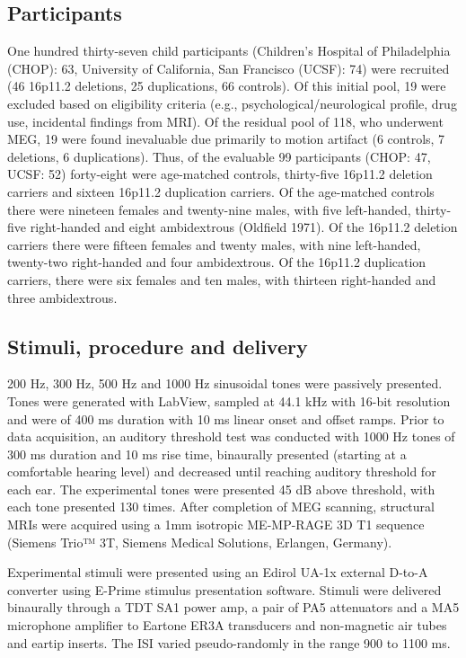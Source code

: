 \documentclass{article}
\begin{document}
\subsection*{Participants}
One hundred thirty-seven child participants (Children’s Hospital of Philadelphia (CHOP): 63, University of California, San Francisco (UCSF): 74) were recruited (46 16p11.2 deletions, 25 duplications, 66 controls). Of this initial pool, 19 were excluded based on eligibility criteria (e.g., psychological/neurological profile, drug use, incidental findings from MRI). Of the residual pool of 118, who underwent MEG, 19 were found inevaluable due primarily to motion artifact (6 controls, 7 deletions, 6 duplications). Thus, of the evaluable 99 participants (CHOP: 47, UCSF: 52) forty-eight were age-matched controls, thirty-five 16p11.2 deletion carriers and sixteen 16p11.2 duplication carriers. Of the age-matched controls there were nineteen females and twenty-nine males, with five left-handed, thirty-five right-handed and eight ambidextrous (Oldfield 1971).  Of the 16p11.2 deletion carriers there were fifteen females and twenty males, with nine left-handed, twenty-two right-handed and four ambidextrous.  Of the 16p11.2 duplication carriers, there were six females and ten males, with thirteen right-handed and three ambidextrous.  
\medskip

\subsection*{Stimuli, procedure and delivery}
200 Hz, 300 Hz, 500 Hz and 1000 Hz sinusoidal tones were passively presented. Tones were generated with LabView, sampled at 44.1 kHz with 16-bit resolution and were of 400 ms duration with 10 ms linear onset and offset ramps. Prior to data acquisition, an auditory threshold test was conducted with 1000 Hz tones of 300 ms duration and 10 ms rise time, binaurally presented (starting at a comfortable hearing level) and decreased until reaching auditory threshold for each ear.  The experimental tones were presented 45 dB above threshold, with each tone presented 130 times.  After completion of MEG scanning, structural MRIs were acquired using a 1mm isotropic ME-MP-RAGE 3D T1 sequence (Siemens Trio™ 3T, Siemens Medical Solutions, Erlangen, Germany).  
\medskip

Experimental stimuli were presented using an Edirol UA-1x external D-to-A converter using E-Prime stimulus presentation software.  Stimuli were delivered binaurally through a TDT SA1 power amp, a pair of PA5 attenuators and a MA5 microphone amplifier to Eartone ER3A transducers and non-magnetic air tubes and eartip inserts. The ISI varied pseudo-randomly in the range 900 to 1100 ms.  
\medskip
\end{document}
